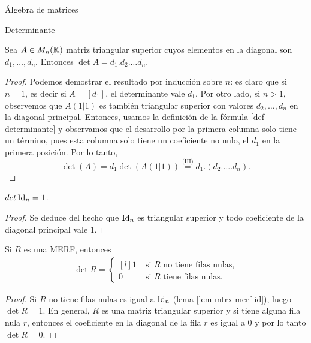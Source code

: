 \begin{chapter}{\'Algebra de matrices}
\begin{section}{Determinante}
   \begin{proposicion}\label{det-triang-sup}
    Sea $A \in M_n(\mathbb K)$ matriz triangular  superior cuyos elementos en la diagonal son $d_1,\ldots,d_n$. Entonces $\det A = d_1.d_2.\ldots d_n$.
    \end{proposicion}
    \begin{proof} Podemos demostrar el resultado por inducción sobre $n$: es claro que si $n=1$,  es decir si $A = [d_1]$, el determinante vale $d_1$. Por otro lado, si $n>1$,  observemos que $A(1|1)$ es también triangular superior con valores $d_2,\ldots,d_n$  en la diagonal principal. Entonces,  usamos la definición de la fórmula \eqref{def-determinante} y observamos que el desarrollo por la primera  columna solo tiene un término, pues esta columna solo tiene un coeficiente no nulo, el $d_1$ en la primera posición. Por lo tanto, 
        \begin{equation*}
        \det(A) = d_1 \det(A(1|1)) \stackrel{\text{(HI)}}{=} d_1.(d_2.\ldots.d_n).
        \end{equation*}
    \end{proof}
    
    \begin{corolario}
        $det \operatorname{Id}_n = 1$.
    \end{corolario}
    \begin{proof}
        Se deduce del hecho que $\operatorname{Id}_n$  es triangular superior y todo coeficiente de la diagonal principal vale 1.
    \end{proof}
    
    \begin{corolario}\label{cor-det-merf}
        Si $R$ es una MERF, entonces 
        \begin{align*}
        \det R = \left\{ \begin{matrix*}[l]
        1 \;&\text{si $R$ no tiene filas nulas,}\\
        0&\text{si $R$ tiene filas nulas.}
        \end{matrix*}\right.  
        \end{align*}
    \end{corolario}
    \begin{proof}
        Si $R$ no tiene filas nulas es igual a $\operatorname{Id}_n$ (lema \ref{lem-mtrx-merf-id}), luego $\det R = 1$. En general, $R$ es una matriz triangular superior y si tiene alguna fila nula $r$, entonces el coeficiente en la diagonal de la fila $r$ es igual a $0$ y por lo tanto     $\det R = 0$.
    \end{proof}


\end{section}
\end{chapter}
